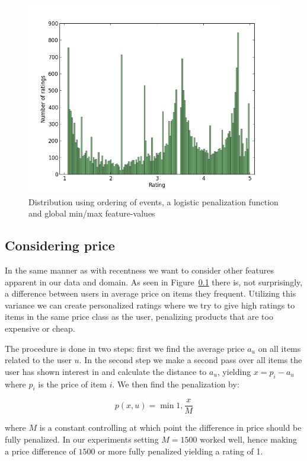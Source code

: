 \begin{figure}[H]
  \centering
  \includegraphics[scale=0.5]{image/dist-sigmoid-fixed-count-3-5}
  \caption{Distribution using ordering of events, a logistic penalization
  function and global min/max feature-values}
  \label{fig:dist-count-sigmoid}
\end{figure}

\subsection{Considering price}

In the same manner as with recentness we want to consider other features
apparent in our data and domain. As seen in Figure~\ref{} there is, not
surprisingly, a difference between users in average price on items they
frequent. Utilizing this variance we can create personalized ratings where we
try to give high ratings to items in the same price class as the user,
penalizing products that are too expensive or cheap.

The procedure is done in two steps: first we find the average price $a_u$ on
all items related to the user $u$. In the second step we make a second pass
over all items the user has shown interest in and calculate the distance to
$a_u$, yielding $x = p_i - a_u$ where $p_i$ is the price of item $i$. We then
find the penalization by:

\begin{equation}
  p(x,u) = \min{1, \frac{x}{M}}
\end{equation}

where $M$ is a constant controlling at which point the difference in price
should be fully penalized. In our experiments setting $M = 1500$ worked well,
hence making a price difference of $1500$ or more fully penalized yielding a
rating of 1.

